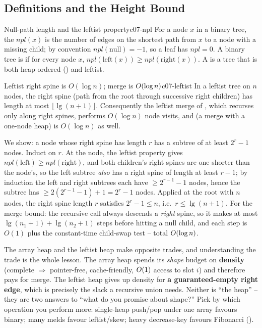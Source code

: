 \subsection{Definitions and the Height Bound}

\begin{definition}{Null-path length and the leftist property}{c07-npl}
For a node $x$ in a binary tree, the  $\mathit{npl}(x)$ is the number of edges on the
shortest path from $x$ to a node with a missing child; by convention $\mathit{npl}(\text{null}) = -1$, so a
leaf has $\mathit{npl}=0$. A binary tree is  if for every node $x$,
$\mathit{npl}(\text{left}(x)) \ge \mathit{npl}(\text{right}(x))$. A  is a tree that is
both heap-ordered () and leftist.
\end{definition}

\begin{theorem}{Leftist right spine is $O(\log n)$; merge is $O(\log n)$}{c07-leftist}
In a leftist tree on $n$ nodes, the right spine (path from the root through successive right children) has
length at most $\lfloor\lg(n+1)\rfloor$. Consequently the leftist merge of , which
recurses only along right spines, performs $O(\log n)$ node visits, and  (a merge with a
one-node heap) is $O(\log n)$ as well.
\end{theorem}
\begin{proofbox}
We show: a node whose right spine has length $r$ has a subtree of at least $2^{r}-1$ nodes. Induct on $r$.
At the node, the leftist property gives $\mathit{npl}(\text{left}) \ge \mathit{npl}(\text{right})$, and both
children's right spines are one shorter than the node's, so the left subtree \emph{also} has a right spine
of length at least $r-1$; by induction the left and right subtrees each have $\ge 2^{r-1}-1$ nodes, hence the
subtree has $\ge 2(2^{r-1}-1)+1 = 2^{r}-1$ nodes. Applied at the root with $n$ nodes, the right spine length
$r$ satisfies $2^{r}-1 \le n$, i.e.\ $r \le \lg(n+1)$. For the merge bound: the recursive call always
descends a \emph{right} spine, so it makes at most $\lg(n_1{+}1)+\lg(n_2{+}1)$ steps before hitting a null
child, and each step is $O(1)$ plus the constant-time child-swap test -- total $O(\log n)$. \end{proofbox}

\begin{insightbox}
The array heap and the leftist heap make opposite trades, and understanding the trade is the whole lesson.
The array heap spends its \emph{shape} budget on \textbf{density} (complete $\Rightarrow$ pointer-free,
cache-friendly, $O(1)$ access to slot $i$) and therefore pays for merge. The leftist heap gives up
density for \textbf{a guaranteed-empty right edge}, which is precisely the slack a recursive union needs.
Neither is ``the heap'' -- they are two answers to ``what do you promise about shape?'' Pick by which
operation you perform more: single-heap push/pop under one array favours binary; many melds favour
leftist/skew; heavy decrease-key favours Fibonacci ().
\end{insightbox}


